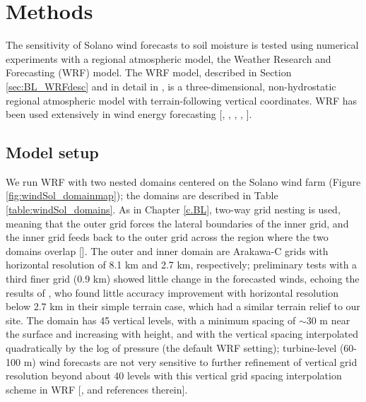 
%
%
%
%
%

\section{Methods}

The sensitivity of Solano wind forecasts to soil moisture is tested using numerical experiments with a regional atmospheric model, the Weather Research and Forecasting (WRF) model.  The WRF model, described in Section \ref{sec:BL_WRFdesc} and in detail in \cite{skamarock2008}, is a three-dimensional, non-hydrostatic regional atmospheric model with terrain-following vertical coordinates. WRF has been used extensively in wind energy forecasting [\cite{marjanovic2014}, \cite{wharton2011review}, \cite{carvalho2012sensitivity}, \cite{deppe2013wrf}, \cite{foley2012current}].

\subsection{Model setup}

We run WRF with two nested domains centered on the Solano wind farm (Figure \ref{fig:windSol_domainmap}); the domains are described in Table \ref{table:windSol_domains}.  As in Chapter \ref{c.BL}, two-way grid nesting is used, meaning that the outer grid forces the lateral boundaries of the inner grid, and the inner grid feeds back to the outer grid across the region where the two domains overlap [\cite{skamarock2008}].  The outer and inner domain are Arakawa-C grids with horizontal resolution of 8.1 km and 2.7 km, respectively; preliminary tests with a third finer grid (0.9 km) showed little change in the forecasted winds, echoing the results of \cite{marjanovic2014}, who found little accuracy improvement with horizontal resolution below 2.7 km in their simple terrain case, which had a similar terrain relief to our site.  The domain has 45 vertical levels, with a minimum spacing of $\sim$30 m near the surface and increasing with height, and with the vertical spacing interpolated quadratically by the log of pressure (the default WRF setting); turbine-level (60-100 m) wind forecasts are not very sensitive to further refinement of vertical grid resolution beyond about 40 levels with this vertical grid spacing interpolation scheme in WRF [\cite{marjanovic2014}, and references therein].

